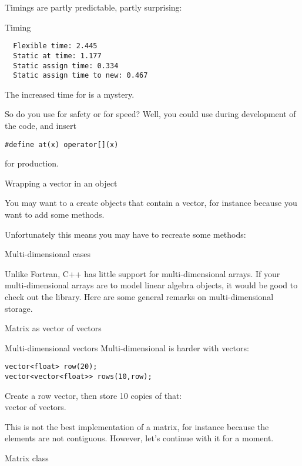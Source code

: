 Timings are partly predictable, partly surprising:
\begin{block}{Timing}
  \label{sl:vector-extend-time}
\begin{lstlisting}
  Flexible time: 2.445
  Static at time: 1.177
  Static assign time: 0.334
  Static assign time to new: 0.467
\end{lstlisting}
\end{block}

The increased time for  is a mystery.

So do you use  for safety or \n{[]} for speed? Well, you could
use  during development of the code, and insert
\begin{lstlisting}
#define at(x) operator[](x)
\end{lstlisting}
for production.

 {Wrapping a vector in an object}

You may want to a create objects that contain a vector, for instance
because you want to add some methods.
%

Unfortunately this means you may have to recreate some methods:
%

 {Multi-dimensional cases}

Unlike Fortran, C++ has little support for multi-dimensional
arrays. If your multi-dimensional arrays are to model linear algebra
objects, it would be good to check out the 
library. Here are some general remarks on multi-dimensional storage.

 {Matrix as vector of vectors}

\begin{block}{Multi-dimensional vectors}
  \label{sl:multi-vector}
  Multi-dimensional is harder with vectors:
\begin{lstlisting}
vector<float> row(20);
vector<vector<float>> rows(10,row);
\end{lstlisting}
Create a row vector, then store 10 copies of that:\\
vector of vectors.
\end{block}

This is not the best implementation of a matrix, for instance because
the elements are not contiguous. However, let's continue with it for a moment.

\begin{block}{Matrix class}
  \label{sl:matrix-class}
\end{block}

